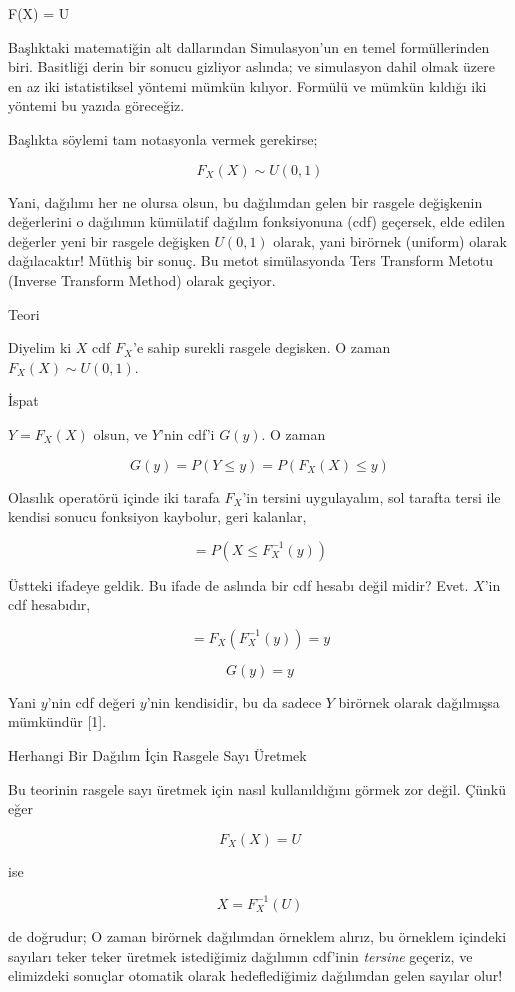 \documentclass[12pt,fleqn]{article}\usepackage{../../common}
\begin{document}
F(X) = U

Başlıktaki matematiğin alt dallarından Simulasyon'un en temel 
formüllerinden biri. Basitliği derin bir sonucu gizliyor aslında; ve
simulasyon dahil olmak üzere en az iki istatistiksel yöntemi mümkün
kılıyor. Formülü ve mümkün kıldığı iki yöntemi bu yazıda göreceğiz.

Başlıkta söylemi tam notasyonla vermek gerekirse;

$$ F_X(X) \sim U(0,1) $$

Yani, dağılımı her ne olursa olsun, bu dağılımdan gelen bir rasgele
değişkenin değerlerini o dağılımın kümülatif dağılım fonksiyonuna (cdf)
geçersek, elde edilen değerler yeni bir rasgele değişken $U(0,1)$ olarak,
yani birörnek (uniform) olarak dağılacaktır!  Müthiş bir sonuç. Bu metot
simülasyonda Ters Transform Metotu (Inverse Transform Method) olarak
geçiyor.

Teori 

Diyelim ki $X$ cdf $F_X$'e sahip surekli rasgele degisken. O zaman $F_X(X)
\sim U(0,1)$.

İspat

$Y = F_X(X)$ olsun, ve $Y$'nin cdf'i $G(y)$. O zaman 

$$ G(y) = P(Y \le y) = P(F_X(X) \le y) $$

Olasılık operatörü içinde iki tarafa $F_X$'in tersini uygulayalım, sol
tarafta tersi ile kendisi sonucu fonksiyon kaybolur, geri kalanlar,

$$ = P(X \le F_X^{-1}(y) ) $$

Üstteki ifadeye geldik. Bu ifade de aslında bir cdf hesabı değil midir?
Evet. $X$'in cdf hesabıdır, 

$$ = F_X(F_X^{-1}(y)) = y $$

$$ G(y) = y $$

Yani $y$'nin cdf değeri $y$'nin kendisidir, bu da sadece $Y$ birörnek
olarak dağılmışsa mümkündür [1]. 

Herhangi Bir Dağılım İçin Rasgele Sayı Üretmek

Bu teorinin rasgele sayı üretmek için nasıl kullanıldığını görmek zor
değil. Çünkü eğer

$$ F_X(X) = U $$

ise 

$$ X = F_X^{-1}(U) $$

de doğrudur; O zaman birörnek dağılımdan örneklem alırız, bu örneklem
içindeki sayıları teker teker üretmek istediğimiz dağılımın cdf'inin {\em
  tersine} geçeriz, ve elimizdeki sonuçlar otomatik olarak hedeflediğimiz
dağılımdan gelen sayılar olur!
\end{document}
